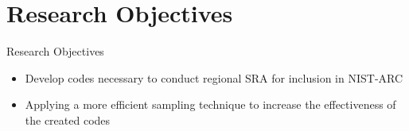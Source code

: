 \section{Research Objectives}

    \begin{frame}{Research Objectives}

        \begin{itemize}
            \setlength\itemsep{1.5em}
            \item Develop codes necessary to conduct regional SRA for inclusion in NIST-ARC
            \item Applying a more efficient sampling technique to increase the effectiveness of the created codes
        \end{itemize}

    \end{frame}
